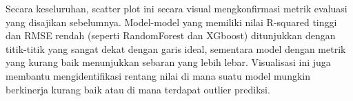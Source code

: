 Secara keseluruhan, scatter plot ini secara visual mengkonfirmasi metrik evaluasi yang disajikan sebelumnya. Model-model yang memiliki nilai 
R-squared tinggi dan RMSE rendah (seperti RandomForest dan XGboost) ditunjukkan dengan titik-titik yang sangat dekat dengan garis ideal, sementara 
model dengan metrik yang kurang baik menunjukkan sebaran yang lebih lebar. Visualisasi ini juga membantu mengidentifikasi rentang nilai di mana 
suatu model mungkin berkinerja kurang baik atau di mana terdapat outlier prediksi.



